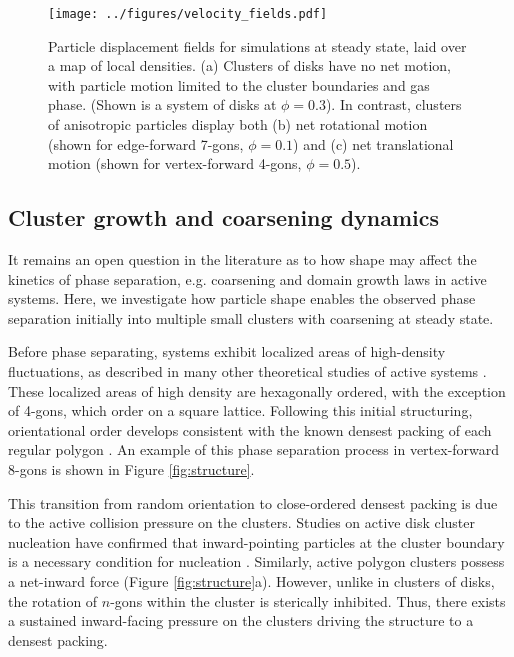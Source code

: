 \begin{figure*}[t]
\begin{center}
\texttt{[image: ../figures/velocity\_fields.pdf]}
\caption{
Particle displacement fields for simulations at steady state, laid over a map of local densities.
(a) Clusters of disks have no net motion, with particle motion limited to the cluster boundaries and gas phase.
(Shown is a system of disks at $\phi=0.3$).
In contrast, clusters of anisotropic particles display both
(b) net rotational motion (shown for edge-forward 7-gons, $\phi=0.1$) and
(c) net translational motion (shown for vertex-forward 4-gons, $\phi=0.5$).
}
\label{fig:velocity}
\end{center}
\end{figure*}

\subsection{Cluster growth and coarsening dynamics}

It remains an open question in the literature as to how shape may affect the kinetics of phase separation, e.g. coarsening and domain growth laws in active systems.
Here, we investigate how particle shape enables the observed phase separation initially into multiple small clusters with coarsening at steady state.

Before phase separating, systems exhibit localized areas of high-density fluctuations, as described in many other theoretical studies of active systems \cite{Cates_2013_EPL, Fily_2012_PRL}.
These localized areas of high density are hexagonally ordered, with the exception of 4-gons, which order on a square lattice.
Following this initial structuring, orientational order develops consistent with the known densest packing of each regular polygon \cite{Atkinson_2012_PRE}.
An example of this phase separation process in vertex-forward 8-gons is shown in Figure \ref{fig:structure}.

This transition from random orientation to close-ordered densest packing is due to the active collision pressure on the clusters.
Studies on active disk cluster nucleation have confirmed that inward-pointing particles at the cluster boundary is a necessary condition for nucleation \cite{Redner_2016_PRL,Richard_2016_SoftMatter}.
Similarly, active polygon clusters possess a net-inward force (Figure \ref{fig:structure}a).
However, unlike in clusters of disks, the rotation of $n$-gons within the cluster is sterically inhibited.
Thus, there exists a sustained inward-facing pressure on the clusters driving the structure to a densest packing.

